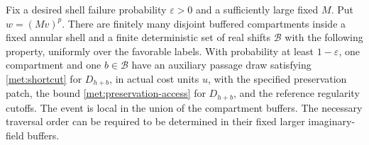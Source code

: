 \begin{lemma}
\label{met:amplification}
Fix a desired shell failure probability $\varepsilon>0$ and a
sufficiently large fixed $M$.  Put $w=(Mv)^p$.  There are finitely
many disjoint buffered compartments inside a fixed annular shell and
a finite deterministic set of real shifts $\mathcal B$ with the
following property, uniformly over the favorable labels.  With
probability at least $1-\varepsilon$, one compartment and one
$b\in\mathcal B$ have an auxiliary passage draw satisfying
\eqref{met:shortcut} for $D_{h+b}$, in actual cost units $u$, with the
specified preservation patch, the bound
\eqref{met:preservation-access} for $D_{h+b}$, and the reference
regularity cutoffs.
The event is local in the union of the compartment buffers.  The
necessary traversal order can be required to be determined in their
fixed larger imaginary-field buffers.
\end{lemma}

